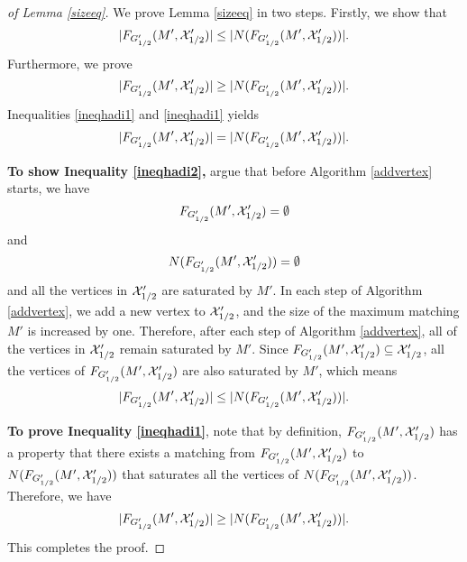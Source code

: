 \begin{proof}[of Lemma \ref{sizeeq}]
We prove Lemma \ref{sizeeq} in two steps. Firstly, we show that
\begin{equation}
\label{ineqhadi2}
|F_{G'_{1/2}}(M',\mathcal{X}'_{1/2})| \leq |N(F_{G'_{1/2}}(M',\mathcal{X}'_{1/2}))|.
\end{equation}
Furthermore, we prove 
\begin{equation}
\label{ineqhadi1}
|F_{G'_{1/2}}(M',\mathcal{X}'_{1/2})| \geq |N(F_{G'_{1/2}}(M',\mathcal{X}'_{1/2}))|.
\end{equation}
Inequalities \eqref{ineqhadi1} and \eqref{ineqhadi1} yields
\begin{equation}
\label{ineqhadi3}
|F_{G'_{1/2}}(M',\mathcal{X}'_{1/2})| = |N(F_{G'_{1/2}}(M',\mathcal{X}'_{1/2}))|.
\end{equation}


\textbf{To show Inequality \eqref{ineqhadi2},} argue that before Algorithm \ref{addvertex} starts, we have $$F_{G'_{1/2}}(M',\mathcal{X}'_{1/2}) = \emptyset$$ and  $$N(F_{G'_{1/2}}(M',\mathcal{X}'_{1/2})) = \emptyset$$ and all the vertices in $\mathcal{X}'_{1/2}$ are saturated by $M'$. In each step of Algorithm \ref{addvertex}, we add a new vertex to $\mathcal{X}'_{1/2}$, and the size of the maximum matching $M'$ is increased by one. Therefore, after each step of Algorithm \ref{addvertex}, all of the vertices in $\mathcal{X}'_{1/2}$ remain saturated by $M'$. Since $F_{G'_{1/2}}(M',\mathcal{X}'_{1/2}) \subseteq \mathcal{X}'_{1/2}$, all the vertices of $F_{G'_{1/2}}(M',\mathcal{X}'_{1/2})$ are also saturated by $M'$, which means
$$|F_{G'_{1/2}}(M',\mathcal{X}'_{1/2})| \leq |N(F_{G'_{1/2}}(M',\mathcal{X}'_{1/2}))|.$$

\textbf{To prove Inequality \eqref{ineqhadi1}}, note that by definition, $F_{G'_{1/2}}(M',\mathcal{X}'_{1/2})$ has a property that there exists a matching from $F_{G'_{1/2}}(M',\mathcal{X}'_{1/2})$ to $N(F_{G'_{1/2}}(M',\mathcal{X}'_{1/2}))$ that saturates all the vertices of $N(F_{G'_{1/2}}(M',\mathcal{X}'_{1/2}))$. Therefore, we have
$$
|F_{G'_{1/2}}(M',\mathcal{X}'_{1/2})| \geq |N(F_{G'_{1/2}}(M',\mathcal{X}'_{1/2}))|.
$$
This completes the proof.
\end{proof}

